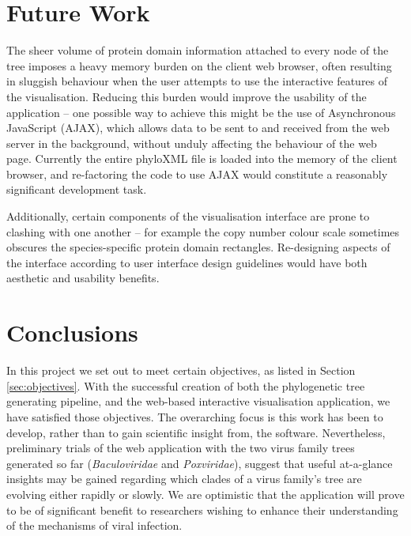 \documentclass[12pt,a4paper]{article}
\begin{document}
\section{Future Work}
The sheer volume of protein domain information attached to every node of the tree imposes a heavy memory burden on the client web browser, often resulting in sluggish behaviour when the user attempts to use the interactive features of the visualisation. Reducing this burden would improve the usability of the application -- one possible way to achieve this might be the use of Asynchronous JavaScript (AJAX), which allows data to be sent to and received from the web server in the background, without unduly affecting the behaviour of the web page. Currently the entire phyloXML file is loaded into the memory of the client browser, and re-factoring the code to use AJAX would constitute a reasonably significant development task.

Additionally, certain components of the visualisation interface are prone to clashing with one another -- for example the copy number colour scale sometimes obscures the species-specific protein domain rectangles. Re-designing aspects of the interface according to user interface design guidelines \citep{shneiderman2016designing} would have both aesthetic and usability benefits.

\section{Conclusions}
In this project we set out to meet certain objectives, as listed in Section \ref{sec:objectives}. With the successful creation of both the phylogenetic tree generating pipeline, and the web-based interactive visualisation application, we have satisfied those objectives. The overarching focus is this work has been to develop, rather than to gain scientific insight from, the software. Nevertheless, preliminary trials of the web application with the two virus family trees generated so far (\textit{Baculoviridae} and \textit{Poxviridae}), suggest that useful at-a-glance insights may be gained regarding which clades of a virus family's tree are evolving either rapidly or slowly. We are optimistic that the application will prove to be of significant benefit to researchers wishing to enhance their understanding of the mechanisms of viral infection.

\newpage
\appendix
\end{document}
